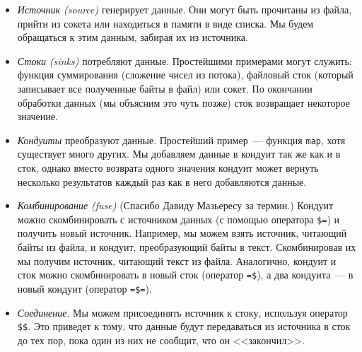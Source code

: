 \begin{itemize}
 \item \emph{Источник (source)} генерирует данные. Они могут быть прочитаны из файла, прийти из
сокета или находиться в памяти в виде списка. Мы будем обращаться к этим данным, забирая их из
источника.

 \item \emph{Стоки (sinks)} потребляют данные.
 Простейшими примерами могут служить: функция суммирования (сложение чисел из потока), файловый сток (который записывает все полученные байты в файл) или сокет.
По окончании обработки данных (мы объясним это чуть позже) сток возвращает некоторое значение.

 \item \emph{Кондуиты} преобразуют данные. Простейший пример~--- функция
\lstinline=map=,
хотя существует много других. Мы добавляем данные в кондуит так же как и в сток, однако вместо
возврата одного значения кондуит может вернуть несколько результатов каждый раз
как в него добавляются данные.

  \item \emph{Комбинирование (fuse)} (Спасибо Давиду Мазьересу за термин.) Кондуит можно
скомбинировать с источником данных (с помощью оператора \lstinline!$=!) и получить
новый источник. Например, мы можем взять источник, читающий байты из файла, и
кондуит, преобразующий байты в текст. Скомбинировав их мы получим
источник, читающий текст из файла. Аналогично, кондуит и сток можно скомбинировать в новый сток
(оператор \lstinline!=$!), а два кондуита~--- в новый кондуит (оператор \lstinline!=$=!).

  \item \emph{Соединение}. Мы можем присоединять источник к стоку, используя оператор \lstinline!$$!.
Это приведет к тому, что данные будут передаваться из источника в сток до тех пор, пока
один из них не сообщит, что он <<закончил>>.
\end{itemize}

